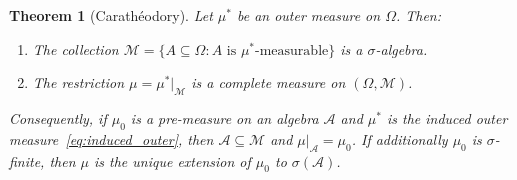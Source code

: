 \documentclass[11pt,a4paper]{article}
\theoremstyle{definition}
\theoremstyle{plain}
\newtheorem{theorem}{Theorem}[section]
\theoremstyle{remark}
\begin{document}
\begin{keyresult}
\begin{theorem}[Carath\'{e}odory]
\label{thm:caratheodory}
Let $\mu^*$ be an outer measure on $\Omega$. Then:
\begin{enumerate}[nosep,label=(\alph*)]
    \item The collection $\mathcal{M} = \{A \subseteq \Omega : A \text{ is $\mu^*$-measurable}\}$ is a $\sigma$-algebra.
    \item The restriction $\mu = \mu^*|_{\mathcal{M}}$ is a complete measure on $(\Omega, \mathcal{M})$.
\end{enumerate}
Consequently, if $\mu_0$ is a pre-measure on an algebra $\mathcal{A}$ and $\mu^*$ is
the induced outer measure~\eqref{eq:induced_outer}, then $\mathcal{A} \subseteq \mathcal{M}$
and $\mu|_{\mathcal{A}} = \mu_0$. If additionally $\mu_0$ is $\sigma$-finite, then
$\mu$ is the unique extension of $\mu_0$ to $\sigma(\mathcal{A})$.
\end{theorem}
\end{keyresult}
\end{document}
